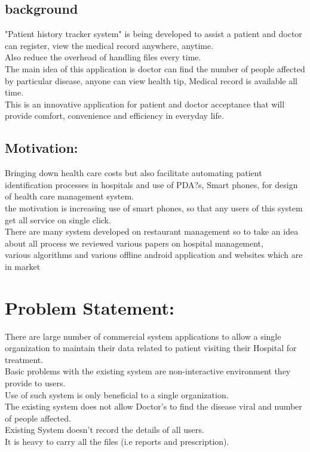 \documentclass[12pt,]{article}
\begin{document}
\subsection{background}
 "Patient history tracker system" is being developed to assist a patient and doctor can register, view the medical record anywhere, anytime.\\Also reduce the overhead of handling files every time.\\ The main idea of this application is doctor can find the number of people affected by particular disease, anyone can view health tip, Medical record is available all time.\\ This is an innovative application for patient and doctor acceptance that will provide comfort, convenience and efficiency in everyday life. 
\subsection{Motivation:}
 Bringing down health care costs but also facilitate automating patient identification processes in hospitals and use of PDA?s, Smart phones, for design of health care management system.\\the motivation is increasing use of smart phones, so that any users of this system get all service on single click.\\ There are many system developed on restaurant management so to take an idea about all process we reviewed various papers on hospital management,\\ various algorithms and various offline android application and websites which are in market 
\section{Problem Statement:}
There are large number of commercial system applications to allow a single organization to maintain their data related to patient visiting their Hospital for treatment.\\ Basic problems with the existing system are non-interactive environment they provide to users.\\ Use of such system is only beneficial to a single organization.\\ The existing system does not allow Doctor's to find the disease viral and number of people affected.\\ Existing System doesn't record the details of all users.\\ It is heavy to carry all the files (i.e reports and prescription). 
\end{document}

